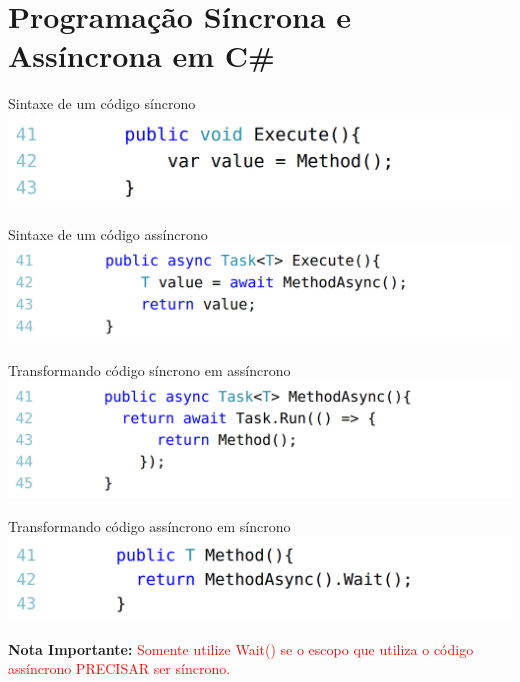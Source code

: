 \documentclass[10pt]{beamer}
\begin{document}
\section{Programação Síncrona e Assíncrona em C\#}

\begin{frame}{Sintaxe de um código síncrono}
	\includegraphics[scale=0.27]{imgs/00-sync.png}
\end{frame}

\begin{frame}{Sintaxe de um código assíncrono}
	\includegraphics[scale=0.27]{imgs/01-async.png}
\end{frame}

\begin{frame}{Transformando código síncrono em assíncrono}
	\includegraphics[scale=0.27]{imgs/02-syncToAsync.png}
\end{frame}

\begin{frame}{Transformando código assíncrono em síncrono}
	\includegraphics[scale=0.27]{imgs/03-asyncToSync.png}
	\vspace{0.5cm}
	
	\textbf{Nota Importante:} \textcolor{red}{Somente utilize Wait() se o escopo que utiliza o código assíncrono PRECISAR ser síncrono.}
\end{frame}
\end{document}
